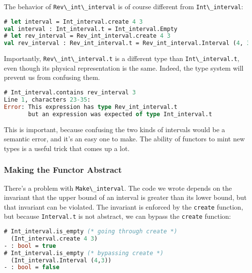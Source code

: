 The behavior of \passthrough{\lstinline!Rev\_int\_interval!} is of
course different from \passthrough{\lstinline!Int\_interval!}:

\begin{lstlisting}[language=Caml]
# let interval = Int_interval.create 4 3
val interval : Int_interval.t = Int_interval.Empty
# let rev_interval = Rev_int_interval.create 4 3
val rev_interval : Rev_int_interval.t = Rev_int_interval.Interval (4, 3)
\end{lstlisting}

Importantly, \passthrough{\lstinline!Rev\_int\_interval.t!} is a
different type than \passthrough{\lstinline!Int\_interval.t!}, even
though its physical representation is the same. Indeed, the type system
will prevent us from confusing them.

\begin{lstlisting}[language=Caml]
# Int_interval.contains rev_interval 3
Line 1, characters 23-35:
Error: This expression has type Rev_int_interval.t
       but an expression was expected of type Int_interval.t
\end{lstlisting}

This is important, because confusing the two kinds of intervals would be
a semantic error, and it's an easy one to make. The ability of functors
to mint new types is a useful trick that comes up a lot.

\hypertarget{making-the-functor-abstract}{%
\subsubsection{Making the Functor
Abstract}\label{making-the-functor-abstract}}

There's a problem with \passthrough{\lstinline!Make\_interval!}. The
code we wrote depends on the invariant that the upper bound of an
interval is greater than its lower bound, but that invariant can be
violated. The invariant is enforced by the
\passthrough{\lstinline!create!} function, but because
\passthrough{\lstinline!Interval.t!} is not abstract, we can bypass the
\passthrough{\lstinline!create!}
function:

\begin{lstlisting}[language=Caml]
# Int_interval.is_empty (* going through create *)
  (Int_interval.create 4 3)
- : bool = true
# Int_interval.is_empty (* bypassing create *)
  (Int_interval.Interval (4,3))
- : bool = false
\end{lstlisting}

